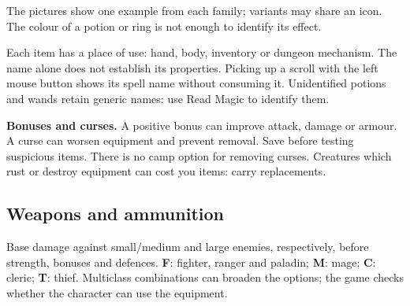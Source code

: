 
The pictures show one example from each family; variants may share an icon. The colour of a potion or ring is not enough to identify its effect.

Each item has a place of use: hand, body, inventory or dungeon mechanism. The name alone does not establish its properties. Picking up a scroll with the left mouse button shows its spell name without consuming it. Unidentified potions and wands retain generic names: use Read Magic to identify them.

\textbf{Bonuses and curses.} A positive bonus can improve attack, damage or armour. A curse can worsen equipment and prevent removal. Save before testing suspicious items. There is no camp option for removing curses. Creatures which rust or destroy equipment can cost you items: carry replacements.

\subsection*{Weapons and ammunition}

Base damage against small/medium and large enemies, respectively, before strength, bonuses and defences. \textbf{F}: fighter, ranger and paladin; \textbf{M}: mage; \textbf{C}: cleric; \textbf{T}: thief. Multiclass combinations can broaden the options; the game checks whether the character can use the equipment.

